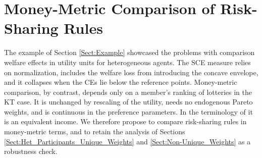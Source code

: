 \documentclass[11pt,a4paper]{article}
\theoremstyle{definition}
\theoremstyle{plain}
\theoremstyle{remark}
\newcommand{\1}{\mathbf{1}}
\begin{document}
\section{Money-Metric Comparison of Risk-Sharing Rules}
\label{Sect:Money_Metric_Comparison}
The example of Section \ref{Sect:Example} showcased the problems with comparison welfare effects in utility units for heterogeneous agents. The SCE measure relies on normalization, includes the welfare loss from introducing the concave envelope, and it collapses when the CEs lie below the reference points. Money-metric comparison, by contrast, depends only on a member's ranking of lotteries in the KT case. It is unchanged by rescaling of the utility, needs no endogenous Pareto weights, and is continuous in the preference parameters. In the terminology of \citet{Fleurbaey2009} it is an equivalent income. We therefore propose to compare risk-sharing rules in money-metric terms, and to retain the analysis of Sections \ref{Sect:Het_Participants_Unique_Weights} and \ref{Sect:Non-Unique_Weights} as a robustness check.
\end{document}
